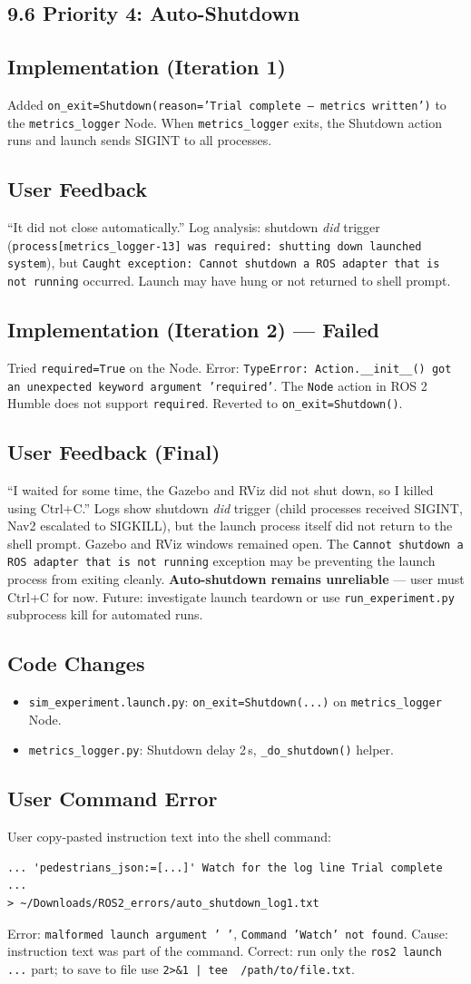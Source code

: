 \documentclass[11pt]{article}
\newcommand{\logentry}[1]{\subsection*{#1}}
\begin{document}
\subsection*{9.6 Priority 4: Auto-Shutdown}

\logentry{Implementation (Iteration 1)}
Added \texttt{on\_exit=Shutdown(reason='Trial complete -- metrics written')}
to the \texttt{metrics\_logger} Node. When \texttt{metrics\_logger} exits, the
Shutdown action runs and launch sends SIGINT to all processes.

\logentry{User Feedback}
``It did not close automatically.'' Log analysis: shutdown \emph{did} trigger
(\texttt{process[metrics\_logger-13] was required: shutting down launched
system}), but \texttt{Caught exception: Cannot shutdown a ROS adapter that is
not running} occurred. Launch may have hung or not returned to shell prompt.

\logentry{Implementation (Iteration 2) --- Failed}
Tried \texttt{required=True} on the Node. Error: \texttt{TypeError:
Action.\_\_init\_\_() got an unexpected keyword argument 'required'}.
The \texttt{Node} action in ROS 2 Humble does not support \texttt{required}.
Reverted to \texttt{on\_exit=Shutdown()}.

\logentry{User Feedback (Final)}
``I waited for some time, the Gazebo and RViz did not shut down, so I killed
using Ctrl+C.'' Logs show shutdown \emph{did} trigger (child processes received
SIGINT, Nav2 escalated to SIGKILL), but the launch process itself did not
return to the shell prompt. Gazebo and RViz windows remained open. The
\texttt{Cannot shutdown a ROS adapter that is not running} exception may be
preventing the launch process from exiting cleanly. \textbf{Auto-shutdown
remains unreliable} --- user must Ctrl+C for now. Future: investigate launch
teardown or use \texttt{run\_experiment.py} subprocess kill for automated runs.

\logentry{Code Changes}
\begin{itemize}
  \item \texttt{sim\_experiment.launch.py}: \texttt{on\_exit=Shutdown(...)} on
    \texttt{metrics\_logger} Node.
  \item \texttt{metrics\_logger.py}: Shutdown delay 2\,s, \texttt{\_do\_shutdown()}
    helper.
\end{itemize}

\logentry{User Command Error}
User copy-pasted instruction text into the shell command:
\begin{verbatim}
... 'pedestrians_json:=[...]' Watch for the log line Trial complete ...
> ~/Downloads/ROS2_errors/auto_shutdown_log1.txt
\end{verbatim}
Error: \texttt{malformed launch argument ' '}, \texttt{Command 'Watch' not found}.
Cause: instruction text was part of the command. Correct: run only the
\texttt{ros2 launch ...} part; to save to file use \texttt{2>\&1 | tee ~/path/to/file.txt}.
\end{document}
